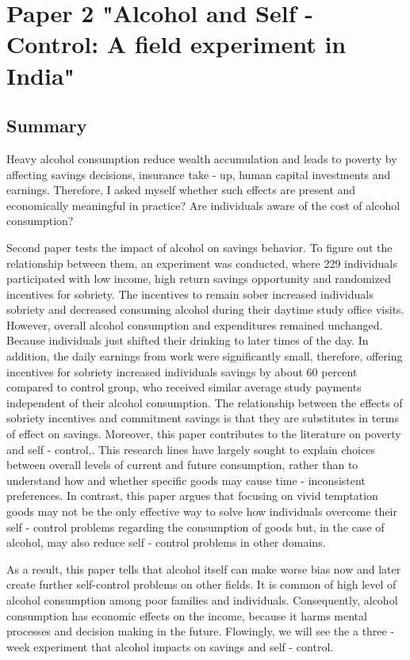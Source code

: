 \documentclass[a4paper,12pt]{article}
\begin{document}
\section{Paper 2 "Alcohol and Self - Control: A field experiment in India"}
\subsection{Summary}
Heavy alcohol consumption reduce wealth accumulation and leads to poverty by affecting savings decisions, insurance take - up, human capital investments and earnings. Therefore, I asked myself whether such effects are present and economically meaningful in practice? Are individuals aware of the cost of alcohol consumption?

Second paper tests the impact of alcohol on savings behavior. To figure out the relationship between them, an experiment was conducted, where 229 individuals participated with low income, high return savings opportunity and randomized incentives for sobriety. The incentives to remain sober increased individuals sobriety  and decreased consuming alcohol during their daytime study office visits. However, overall alcohol consumption and expenditures remained unchanged. Because individuals just shifted their drinking to later times of the day. In addition, the daily earnings from work were significantly small, therefore, offering incentives for sobriety increased individuals savings by about 60 percent compared to control group, who received similar average study payments independent of their alcohol consumption. The relationship between the effects of sobriety incentives and commitment savings is that they are substitutes in terms of effect on savings.    
Moreover, this paper contributes to the literature on poverty and self - control,\cite{Fisher30}. This research lines have largely sought to explain choices between overall levels of current and future consumption, rather than to understand how and whether specific goods may cause time - inconsistent preferences. In contrast, this paper argues that focusing on vivid temptation goods may not be the only effective way to solve how individuals overcome their self - control problems regarding the consumption of goods but, in the case of alcohol, may also reduce self - control problems in other domains. 


As a result, this paper tells that alcohol itself can make worse bias now and later create further self-control problems on other fields.  It is common of high level of alcohol consumption among poor families and individuals. Consequently, alcohol consumption has economic effects on the income, because it harms mental processes and decision making in the future. Flowingly, we will see the a three - week experiment that alcohol impacts on savings and self - control. 
\end{document}
